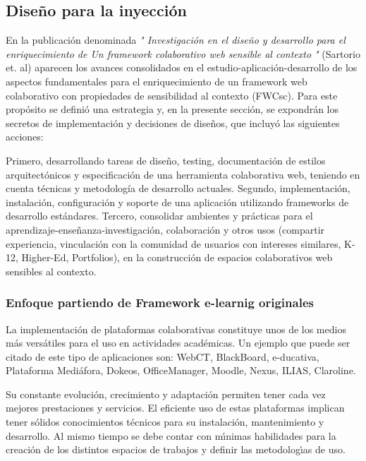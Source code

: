 \subsection{Diseño para la inyección}

En la publicación denominada \textit{" Investigación en el diseño y desarrollo para el enriquecimiento de
Un framework colaborativo web sensible al contexto "} (Sartorio et. al) \cite{inyecccion} aparecen los avances consolidados en el estudio-aplicación-desarrollo
de los aspectos fundamentales para el enriquecimiento de un framework web colaborativo con propiedades de sensibilidad al contexto
(FWCsc). Para este propósito se definió una estrategia y, en la presente sección, se expondrán los secretos de implementación y decisiones de diseños, que incluyó las siguientes acciones: 

Primero, desarrollando tareas de diseño, testing, documentación
de estilos arquitectónicos y especificación de una herramienta colaborativa web, teniendo en cuenta técnicas y metodología de desarrollo actuales. Segundo, implementación, instalación, configuración y soporte de una aplicación utilizando frameworks de desarrollo estándares. Tercero, consolidar ambientes y prácticas para el aprendizaje-enseñanza-investigación, colaboración y otros usos (compartir experiencia, vinculación con la comunidad de usuarios con intereses similares, K-12, Higher-Ed, Portfolios), en la construcción de espacios colaborativos web sensibles al contexto.

\subsubsection{Enfoque partiendo de Framework e-learnig originales}

La implementación de plataformas colaborativas constituye unos
de los medios más versátiles para el uso en actividades académicas. Un ejemplo que puede ser citado de este tipo de aplicaciones son: 
WebCT, BlackBoard, e-ducativa, Plataforma Mediáfora, Dokeos,
OfficeManager, Moodle, Nexus, ILIAS, Claroline.

Su constante evolución, crecimiento y adaptación permiten
tener cada vez mejores prestaciones y servicios. El eficiente uso
de estas plataformas implican tener sólidos conocimientos técnicos
para su instalación, mantenimiento y desarrollo. Al mismo tiempo
se debe contar con mı́nimas habilidades para la creación de los
distintos espacios de trabajos y definir las metodologı́as de uso.


